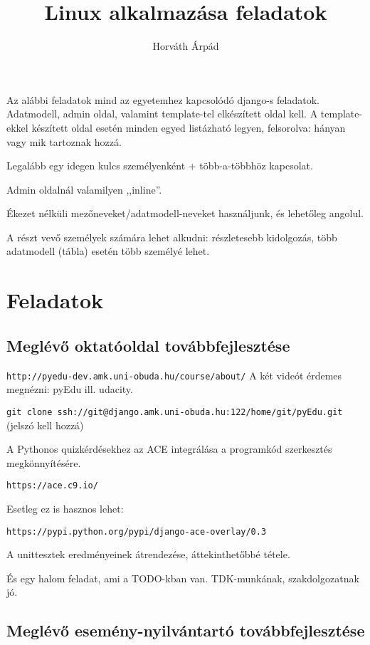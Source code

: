 \documentclass[a4paper]{article}
\begin{document}
\title{Linux alkalmazása feladatok}
\author{Horváth Árpád}
\maketitle

Az alábbi feladatok mind az egyetemhez kapcsolódó django-s feladatok.
Adatmodell, admin oldal, valamint template-tel elkészített oldal kell.
A template-ekkel készített oldal esetén minden egyed listázható legyen,
felsorolva: hányan vagy mik tartoznak hozzá.

Legalább egy idegen kulcs személyenként + több-a-többhöz kapcsolat.

Admin oldalnál valamilyen ,,inline''.

Ékezet nélküli mezőneveket/adatmodell-neveket használjunk, és lehetőleg angolul.

A részt vevő személyek számára lehet alkudni: részletesebb kidolgozás,
több adatmodell (tábla) esetén több személyé lehet.

\section{Feladatok}

\subsection{Meglévő oktatóoldal továbbfejlesztése}

\verb+http://pyedu-dev.amk.uni-obuda.hu/course/about/+
A két videót érdemes megnézni: pyEdu ill. udacity.

\verb+git clone ssh://git@django.amk.uni-obuda.hu:122/home/git/pyEdu.git+
(jelszó kell hozzá)

A Pythonos quizkérdésekhez az ACE integrálása a programkód szerkesztés
megkönnyítésére.

\verb+https://ace.c9.io/+

Esetleg ez is hasznos lehet:

\verb+https://pypi.python.org/pypi/django-ace-overlay/0.3+

A unittesztek eredményeinek átrendezése, áttekinthetőbbé tétele.

És egy halom feladat, ami a TODO-kban van. TDK-munkának, szakdolgozatnak
jó.

\subsection{Meglévő esemény-nyilvántartó továbbfejlesztése}
\end{document}
